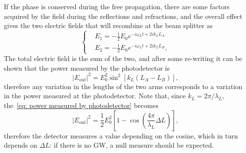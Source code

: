 If the phase is conserved during the free propagation, there are some factors acquired by the field during the reflections and refractions, and the overall effect gives the two electric fields that will recombine at the beam splitter as
\begin{equation}
    \left\{
        \begin{aligned}
            &E_1 = -\frac{1}{2}E_0e^{-i\omega_L t + 2ik_L L_A} \\
            &E_2 = -\frac{1}{2}E_0e^{-i\omega_L t + 2ik_L L_B},
        \end{aligned}
    \right.
    \label{eq: fields in arms of michaelson}
\end{equation}
The total electric field is the sum of the two, and after some re-writing it can be shown that the power measured by the photodetector is 
\begin{equation}
    |E_{out}|^2 = E_0^2 \sin^2[k_L(L_A-L_B)],
    \label{eq: power measured by photodetector}
\end{equation}
therefore any variation in the lengths of the two arms corresponds to a variation in the power measured at the photodetector.
Note that, since $k_L=2\pi/\lambda_L$, the~\eqref{eq: power measured by photodetector} becomes
\begin{equation*}
    |E_{out}|^2 = \frac{1}{2} E_0^2 \left[1-\cos{\left(\frac{4\pi}{\lambda_L}\Delta L\right)}\right],
\end{equation*}
therefore the detector measures a value depending on the cosine, which in turn depends on $\Delta L$: if there is no GW, a null measure should be expected.


